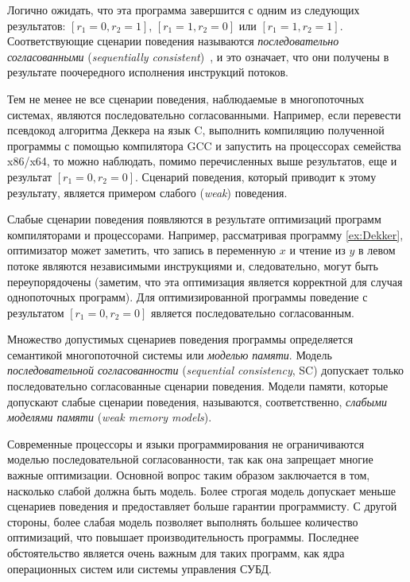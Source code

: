 Логично ожидать, что эта программа 
завершится с одним из следующих результатов: 
${[r_1=0, r_2=1]}$, ${[r_1=1,r_2=0]}$ или ${[r_1=1,r_2=1]}$. 
Соответствующие сценарии поведения называются 
\emph{последовательно согласованными} 
(\emph{sequentially consistent})~\cite{Lamport:TC79}, и это означает, 
что они получены в результате поочередного 
исполнения инструкций потоков. 

Тем не менее не все сценарии поведения, наблюдаемые в
многопоточных  системах, являются последовательно согласованными.
Например, если перевести псевдокод алгоритма Деккера
на язык C, выполнить компиляцию полученной программы с помощью компилятора GCC
и  запустить на процессорах семейства x86/x64, то
можно  наблюдать, помимо перечисленных выше результатов, еще и результат  $[r_1=0, r_2=0]$. 
Сценарий поведения, который приводит к этому результату, 
является примером  слабого (\emph{weak}) поведения.

Слабые сценарии поведения появляются в результате оптимизаций программ
компиляторами и процессорами. Например, 
рассматривая программу \ref{ex:Dekker}, 
оптимизатор может заметить, что запись в переменную $x$
и чтение из $y$ в левом потоке являются независимыми инструкциями 
и, следовательно, могут быть переупорядочены
(заметим, что эта оптимизация является корректной 
для случая однопоточных программ).
Для оптимизированной программы поведение с результатом
$[r_1=0, r_2=0]$ является последовательно согласованным.

Множество допустимых сценариев поведения программы определяется
семантикой многопоточной системы или \emph{моделью памяти}.
Модель \emph{последовательной согласованности}
(\emph{sequential consistency}, SC) допускает 
только последовательно согласованные сценарии поведения.
Модели памяти, которые   допускают слабые сценарии поведения, 
называются, соответственно, \emph{слабыми моделями памяти}
(\emph{weak memory models}).

Современные процессоры и языки программирования 
не ограничиваются моделью последовательной согласованности, 
так как она запрещает многие важные оптимизации.
Основной вопрос таким образом заключается в том, насколько слабой 
должна быть модель. Более строгая модель допускает меньше сценариев поведения 
и предоставляет больше гарантии программисту.
С другой стороны, более слабая модель позволяет
выполнять большее количество оптимизаций, что повышает производительность программы. Последнее обстоятельство является очень важным для таких программ, как ядра операционных систем или системы управления СУБД. 

